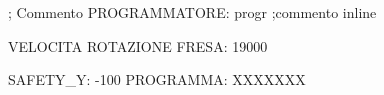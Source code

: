 ; Commento
PROGRAMMATORE:            progr    ;commento inline

VELOCITA ROTAZIONE FRESA: 19000

SAFETY_Y: -100
PROGRAMMA: XXXXXXX
